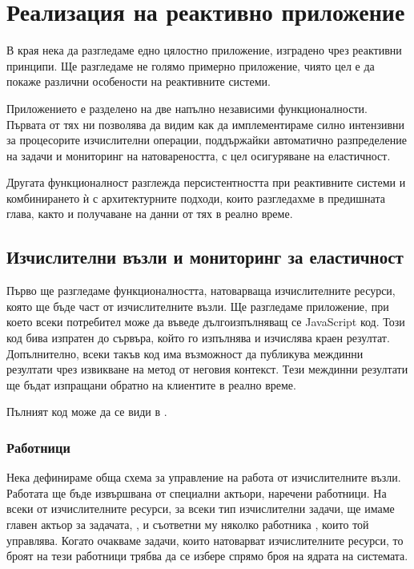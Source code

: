 \chapter{Реализация на реактивно приложение}
\label{ch:implementing-a-reactive-application}

В края нека да разгледаме едно цялостно приложение, изградено чрез реактивни принципи. Ще разгледаме не голямо примерно приложение, чиято цел е да покаже различни особености на реактивните системи.

Приложението е разделено на две напълно независими функционалности. Първата от тях ни позволява да видим как да имплементираме силно интензивни за процесорите изчислителни операции, поддържайки автоматично разпределение на задачи и мониторинг на натовареността, с цел осигуряване на еластичност.

Другата функционалност разглежда персистентността при реактивните системи и комбинирането ѝ с архитектурните подходи, които разгледахме в предишната глава, както и получаване на данни от тях в реално време.

\section{Изчислителни възли и мониторинг за еластичност}

Първо ще разгледаме функционалността, натоварваща изчислителните ресурси, която ще бъде част от изчислителните възли. Ще разгледаме приложение, при което всеки потребител може да въведе дългоизпълняващ се JavaScript код. Този код бива изпратен до сървъра, който го изпълнява и изчислява краен резултат. Допълнително, всеки такъв код има възможност да публикува междинни резултати чрез извикване на  метод от неговия контекст. Тези междинни резултати ще бъдат изпращани обратно на клиентите в реално време.

Пълният код може да се види в .

\subsection{Работници}

Нека дефинираме обща схема за управление на работа от изчислителните възли. Работата ще бъде извършвана от специални актьори, наречени работници. На всеки от изчислителните ресурси, за всеки тип изчислителни задачи, ще имаме главен актьор за задачата, , и съответни му няколко работника , които той управлява. Когато очакваме задачи, които натоварват изчислителните ресурси, то броят на тези работници трябва да се избере спрямо броя на ядрата на системата.
 
